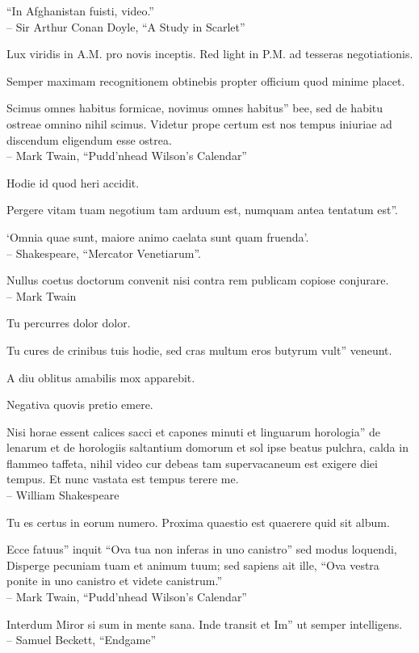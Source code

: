 \documentclass[titlepage,12pt]{memoir}
\begin{document}
 “In Afghanistan fuisti, video.”
\\-- Sir Arthur Conan Doyle, “A Study in Scarlet”

Lux viridis in A.M. pro novis inceptis. Red light in P.M. ad tesseras negotiationis.

Semper maximam recognitionem obtinebis propter officium quod minime placet.

Scimus omnes habitus formicae, novimus omnes habitus”
bee, sed de habitu ostreae omnino nihil scimus. Videtur
prope certum est nos tempus iniuriae ad discendum eligendum esse
ostrea.
\\-- Mark Twain, “Pudd’nhead Wilson’s Calendar”

Hodie id quod heri accidit.

Pergere vitam tuam negotium tam arduum est, numquam antea tentatum est”.

‘Omnia quae sunt, maiore animo caelata sunt quam fruenda’.
\\-- Shakespeare, “Mercator Venetiarum”.

Nullus coetus doctorum convenit nisi contra rem publicam copiose conjurare.
\\-- Mark Twain

Tu percurres dolor dolor.

Tu cures de crinibus tuis hodie, sed cras multum eros butyrum vult”
veneunt.

A diu oblitus amabilis mox apparebit.

Negativa quovis pretio emere.

Nisi horae essent calices sacci et capones minuti et linguarum horologia”
de lenarum et de horologiis saltantium domorum et sol ipse beatus
pulchra, calda in flammeo taffeta, nihil video cur debeas
tam supervacaneum est exigere diei tempus. Et nunc vastata est
tempus terere me.
\\-- William Shakespeare

Tu es certus in eorum numero. Proxima quaestio est quaerere quid sit album.

Ecce fatuus” inquit “Ova tua non inferas in uno canistro”
sed modus loquendi, Disperge pecuniam tuam et animum tuum; sed sapiens
ait ille, “Ova vestra ponite in uno canistro et videte canistrum.”
\\-- Mark Twain, “Pudd’nhead Wilson’s Calendar”

Interdum Miror si sum in mente sana. Inde transit et Im”
ut semper intelligens.
\\-- Samuel Beckett, “Endgame”
\end{document}
